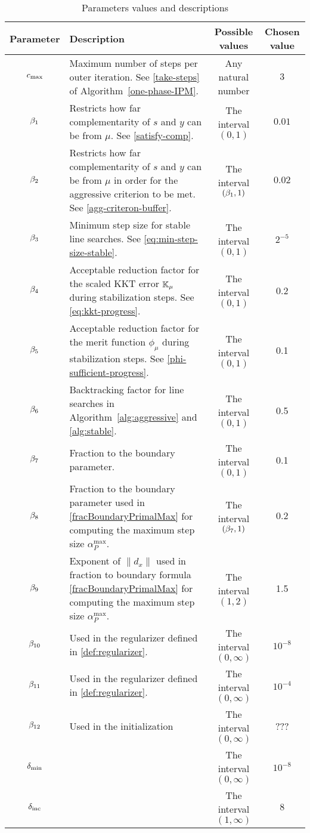 \documentclass{article}
\begin{document}
\begin{table}[H]
\begin{tabular}{ |c| p{7cm}|c|c| } 
 \hline
Parameter & Description & Possible values & Chosen value  \\ 
 \hline
$c_{\max}$ & Maximum number of steps per outer iteration. See \eqref{take-steps} of Algorithm~\ref{one-phase-IPM}.  & Any natural number & $3$  \\ 
 \hline
  $\beta_{1}$ & Restricts how far complementarity of $s$ and $y$ can be from $\mu$. See \eqref{satisfy-comp}.  & The interval $(0,1)$ & $0.01$ \\ 
 \hline
   $\beta_{2}$ & Restricts how far complementarity of $s$ and $y$ can be from $\mu$ in order for the aggressive criterion to be met. See \eqref{agg-criteron-buffer}.  & The interval  $(\beta_{1},1)$ & $0.02$  \\ 
    \hline
   $\beta_{3}$ & Minimum step size for stable line searches. See \eqref{eq:min-step-size-stable}.  & The interval $(0,1)$ & $2^{-5}$  \\ 
   \hline 
      $\beta_{4}$ & Acceptable reduction factor for the scaled KKT error $\mathbb{K}_{\mu}$ during stabilization steps. See \eqref{eq:kkt-progress}.  & The interval $(0,1)$ & 0.2 \\ 
      \hline
            $\beta_{5}$ & Acceptable reduction factor for the merit function $\phi_{\mu}$ during stabilization steps. See \eqref{phi-sufficient-progress}.  & The interval $(0,1)$ & 0.1  \\
    \hline
    $\beta_{6}$ & Backtracking factor for line searches in Algorithm~\ref{alg:aggressive} and \ref{alg:stable}. & The interval $(0,1)$ & 0.5 \\
\hline
 $\beta_{7}$ & Fraction to the boundary parameter.  & The interval $(0,1)$ & 0.1 \\ 
        \hline
$\beta_{8}$ & Fraction to the boundary parameter used in \eqref{fracBoundaryPrimalMax} for computing the maximum step size $\alpha_{P}^{\max}$. & The interval $(\beta_{7},1)$ & $0.2$ \\
\hline
$\beta_{9}$ & Exponent of $\| d_{x} \|$ used in fraction to boundary formula \eqref{fracBoundaryPrimalMax} for computing the maximum step size $\alpha_{P}^{\max}$. & The interval $(1,2)$ & 1.5 \\
\hline
$\beta_{10}$ & Used in the regularizer defined in \eqref{def:regularizer}. & The interval $(0,\infty)$ & $10^{-8}$ \\
\hline
$\beta_{11}$ & Used in the regularizer defined in \eqref{def:regularizer}. & The interval $(0,\infty)$ & $10^{-4}$ \\
\hline
$\beta_{12}$  & Used in the initialization & The interval $(0,\infty)$ & ??? \\
\hline
$\delta_{\min}$ &  & The interval $(0,\infty)$ & $10^{-8}$ \\
\hline
$\delta_{\text{inc}}$ & &The interval $(1,\infty)$ & $8$ \\
\hline
\end{tabular}
\caption{Parameters values and descriptions}
\end{table}
\end{document}
